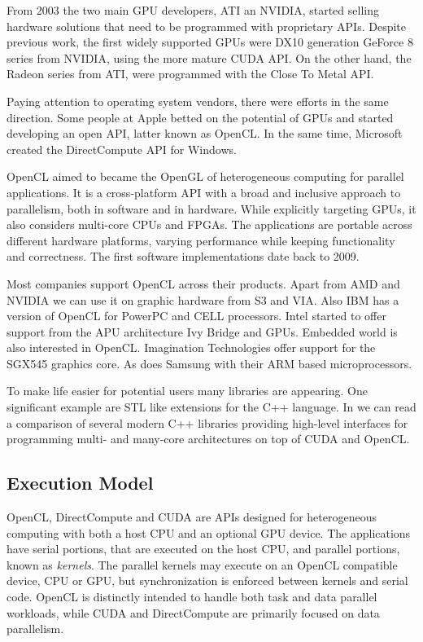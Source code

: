 \documentclass[Afour,sageh,times]{sagej}
\begin{document}
From 2003 the two main GPU developers, ATI an NVIDIA, started selling hardware solutions that need to be programmed with proprietary APIs. Despite previous work, the first widely supported GPUs were DX10 generation GeForce 8 series from NVIDIA, using the more mature CUDA API. On the other hand, the Radeon series from ATI, were programmed with the Close To Metal API.

Paying attention to operating system vendors, there were efforts in the same direction. Some people at Apple betted on the potential of GPUs and started developing an open API, latter known as OpenCL. In the same time, Microsoft created the DirectCompute API for Windows.

OpenCL aimed to became the OpenGL of heterogeneous computing for parallel applications. It is a cross-platform API with a broad and inclusive approach to parallelism, both in software and in hardware. While explicitly targeting GPUs, it also considers multi-core CPUs and FPGAs. The applications are portable across different hardware platforms, varying performance while keeping functionality and correctness. The first software implementations date back to 2009.

Most companies support OpenCL across their products. Apart from AMD and NVIDIA we can use it on graphic hardware from S3 and VIA. Also IBM has a version of OpenCL for PowerPC and CELL processors. Intel started to offer support from the APU architecture Ivy Bridge and GPUs. Embedded world is also interested in OpenCL. Imagination Technologies offer support for the SGX545 graphics core. As does Samsung with their ARM based microprocessors.

To make life easier for potential users many libraries are appearing. One significant example are STL like extensions for the C++ language. In \citep{doi:10.1137/120903683} we can read a comparison of several modern C++ libraries providing high-level interfaces for programming multi- and many-core architectures on top of CUDA and OpenCL.

\subsection{Execution Model}

OpenCL, DirectCompute and CUDA are APIs designed for heterogeneous computing with both a host CPU and an optional GPU device. The applications have serial portions, that are executed on the host CPU, and parallel portions, known as \textit{kernels}. The parallel kernels may execute on an OpenCL compatible device, CPU or GPU, but synchronization is enforced between kernels and serial code. OpenCL is distinctly intended to handle both task and data parallel workloads, while CUDA and DirectCompute are primarily focused on data parallelism.
\end{document}
